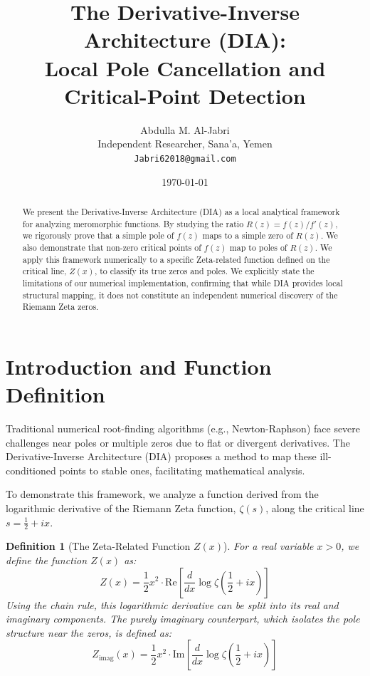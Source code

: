 \documentclass[12pt,a4paper]{article}
\title{\textbf{The Derivative-Inverse Architecture (DIA):\\Local Pole Cancellation and Critical-Point Detection}}
\author{Abdulla M. Al-Jabri \\ \small Independent Researcher, Sana'a, Yemen \\ \small \texttt{Jabri62018@gmail.com}}
\date{\today}
\newtheorem{definition}{Definition}
\begin{document}
\maketitle

\begin{abstract}
We present the Derivative-Inverse Architecture (DIA) as a local analytical framework for analyzing meromorphic functions. By studying the ratio \(R(z) = f(z)/f'(z)\), we rigorously prove that a simple pole of \(f(z)\) maps to a simple zero of \(R(z)\). We also demonstrate that non-zero critical points of \(f(z)\) map to poles of \(R(z)\). We apply this framework numerically to a specific Zeta-related function defined on the critical line, \(Z(x)\), to classify its true zeros and poles. We explicitly state the limitations of our numerical implementation, confirming that while DIA provides local structural mapping, it does not constitute an independent numerical discovery of the Riemann Zeta zeros.
\end{abstract}

\section{Introduction and Function Definition}
Traditional numerical root-finding algorithms (e.g., Newton-Raphson) face severe challenges near poles or multiple zeros due to flat or divergent derivatives. The Derivative-Inverse Architecture (DIA) proposes a method to map these ill-conditioned points to stable ones, facilitating mathematical analysis.

To demonstrate this framework, we analyze a function derived from the logarithmic derivative of the Riemann Zeta function, \(\zeta(s)\), along the critical line \(s = \frac{1}{2} + ix\). 

\begin{definition}[The Zeta-Related Function \(Z(x)\)]
For a real variable \(x > 0\), we define the function \(Z(x)\) as:
\begin{equation}
Z(x) = \frac{1}{2} x^2 \cdot \text{Re} \left[ \frac{d}{dx} \log \zeta\left(\frac{1}{2} + ix\right) \right]
\end{equation}
Using the chain rule, this logarithmic derivative can be split into its real and imaginary components. The purely imaginary counterpart, which isolates the pole structure near the zeros, is defined as:
\begin{equation}
Z_{\text{imag}}(x) = \frac{1}{2} x^2 \cdot \text{Im} \left[ \frac{d}{dx} \log \zeta\left(\frac{1}{2} + ix\right) \right]
\end{equation}
\end{definition}
\end{document}
